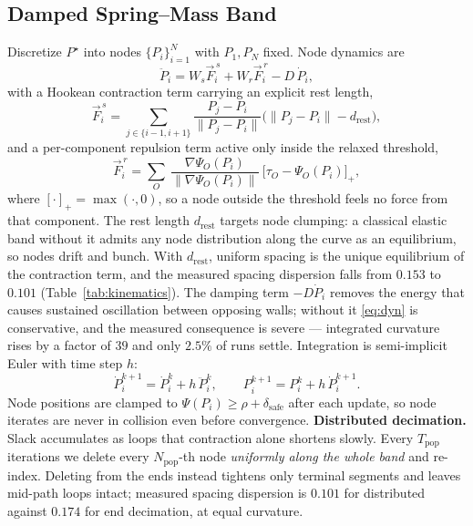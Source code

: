 \documentclass[conference]{IEEEtran}
\begin{document}
\subsection{Damped Spring--Mass Band}
Discretize $P^\star$ into nodes $\{P_i\}_{i=1}^{N}$ with $P_1,P_N$ fixed. Node dynamics are
\begin{equation}
\ddot{P}_i = W_s \vec{F}^{\,s}_i + W_r \vec{F}^{\,r}_i - D\,\dot{P}_i ,
\label{eq:dyn}
\end{equation}
with a Hookean contraction term carrying an explicit rest length,
\begin{equation}
\vec{F}^{\,s}_i=\!\!\sum_{j\in\{i-1,i+1\}}\!\!\frac{P_j-P_i}{\|P_j-P_i\|}\Big(\|P_j-P_i\|-d_{\mathrm{rest}}\Big),
\end{equation}
and a per-component repulsion term active only inside the relaxed threshold,
\begin{equation}
\vec{F}^{\,r}_i=\sum_{O}\ \frac{\nabla\Psi_O(P_i)}{\|\nabla\Psi_O(P_i)\|}\ \big[\tau_O-\Psi_O(P_i)\big]_+ ,
\end{equation}
where $[\cdot]_+=\max(\cdot,0)$, so a node outside the threshold feels no force from that component.
The rest length $d_{\mathrm{rest}}$ targets node clumping: a classical elastic band without it admits any node distribution along the curve as an equilibrium, so nodes drift and bunch. With $d_{\mathrm{rest}}$, uniform spacing is the unique equilibrium of the contraction term, and the measured spacing dispersion falls from $0.153$ to $0.101$ (Table~\ref{tab:kinematics}). The damping term $-D\dot{P}_i$ removes the energy that causes sustained oscillation between opposing walls; without it \eqref{eq:dyn} is conservative, and the measured consequence is severe --- integrated curvature rises by a factor of $39$ and only $2.5\%$ of runs settle.
Integration is semi-implicit Euler with time step $h$:
\begin{equation}
\dot{P}_i^{k+1}=\dot{P}_i^{k}+h\,\ddot{P}_i^{k},\qquad P_i^{k+1}=P_i^{k}+h\,\dot{P}_i^{k+1}.
\end{equation}
Node positions are clamped to $\Psi(P_i)\ge\rho+\delta_{\mathrm{safe}}$ after each update, so node iterates are never in collision even before convergence.
\textbf{Distributed decimation.} Slack accumulates as loops that contraction alone shortens slowly. Every $T_{\mathrm{pop}}$ iterations we delete every $N_{\mathrm{pop}}$-th node \emph{uniformly along the whole band} and re-index. Deleting from the ends instead tightens only terminal segments and leaves mid-path loops intact; measured spacing dispersion is $0.101$ for distributed against $0.174$ for end decimation, at equal curvature.
\end{document}

